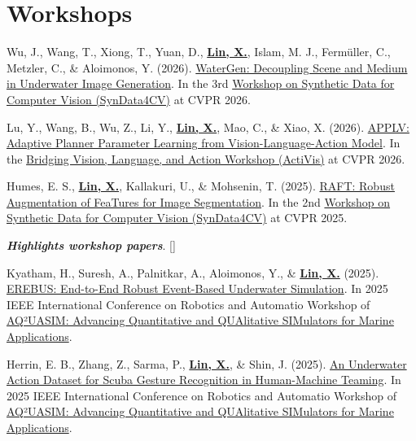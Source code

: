 \documentclass[a4paper,11pt]{article}
\begin{document}
\section*{Workshops}
\small{
\begin{enumerate}[leftmargin=*, labelsep=0.5em, align=left, widest={[\textbf{W.1}]}, itemindent=0em, label={\textbf{[\arabic*]}}]

\item[\textbf{[W.8]}] Wu, J., Wang, T., Xiong, T., Yuan, D., \textbf{\underline{Lin, X.}}, Islam, M. J., Fermüller, C., Metzler, C., \& Aloimonos, Y. (2026). \href{https://openreview.net/forum?id=86HyQOUle8}{WaterGen: Decoupling Scene and Medium in Underwater Image Generation}. In the 3rd \href{https://syndata4cv.github.io/}{Workshop on Synthetic Data for Computer Vision (SynData4CV)} at CVPR 2026.

\item[\textbf{[W.7]}] Lu, Y., Wang, B., Wu, Z., Li, Y., \textbf{\underline{Lin, X.}}, Mao, C., \& Xiao, X. (2026). \href{https://openreview.net/forum?id=lq4ZxvVoOP}{APPLV: Adaptive Planner Parameter Learning from Vision-Language-Action Model}. In the \href{https://activis-workshop.github.io/}{Bridging Vision, Language, and Action Workshop (ActiVis)} at CVPR 2026.

\item[\textbf{[W.6]}] Humes, E. S., \textbf{\underline{Lin, X.}}, Kallakuri, U., \& Mohsenin, T. (2025). \href{https://openreview.net/forum?id=uHxvIXPT2c}{RAFT: Robust Augmentation of FeaTures for Image Segmentation}. In the 2nd \href{https://syndata4cv.github.io/}{Workshop on Synthetic Data for Computer Vision (SynData4CV)} at CVPR 2025.

\item[\textbf{[W.5]}] 
\textbf{\textit{Highlights workshop papers}}. [\href{https://sites.google.com/view/aq2uasim/highlights-workshop-papers}{\textcolor{darkblue}{}}]

Kyatham, H., Suresh, A., Palnitkar, A., Aloimonos, Y., \& \textbf{\underline{Lin, X.}} (2025). \href{https://xiaominlin.github.io/files/ICRA2025_AQUA2SIM_EREBUS.pdf}{EREBUS: End-to-End Robust Event-Based Underwater Simulation}. In 2025 IEEE
International Conference on Robotics and Automatio Workshop of \href{https://sites.google.com/view/aq2uasim/call-for-papers}{AQ²UASIM: Advancing Quantitative and QUAlitative SIMulators for Marine Applications}.

\item[\textbf{[W.4]}] Herrin, E. B., Zhang, Z., Sarma, P., \textbf{\underline{Lin, X.}}, \& Shin, J. (2025). \href{https://xiaominlin.github.io/files/ICRA2025_AQ2UASIM_Workshop_Diver_Dataset.pdf}{An Underwater Action Dataset for Scuba Gesture Recognition in Human-Machine Teaming}. In 2025 IEEE
International Conference on Robotics and Automatio Workshop of \href{https://sites.google.com/view/aq2uasim/call-for-papers}{AQ²UASIM: Advancing Quantitative and QUAlitative SIMulators for Marine Applications}.



\end{enumerate}}
\end{document}
